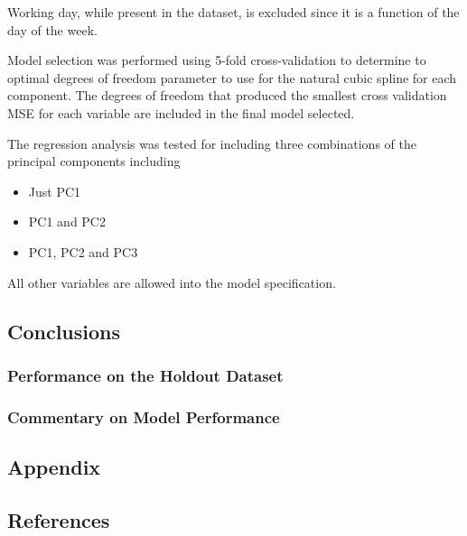 \documentclass[
]{article}
\begin{document}
Working day, while present in the dataset, is excluded since it is a
function of the day of the week.

Model selection was performed using 5-fold cross-validation to determine
to optimal degrees of freedom parameter to use for the natural cubic
spline for each component. The degrees of freedom that produced the
smallest cross validation MSE for each variable are included in the
final model selected.

The regression analysis was tested for including three combinations of
the principal components including

\begin{itemize}
\item
  Just PC1
\item
  PC1 and PC2
\item
  PC1, PC2 and PC3
\end{itemize}

All other variables are allowed into the model specification.

\hypertarget{conclusions}{%
\subsection{Conclusions}\label{conclusions}}

\hypertarget{performance-on-the-holdout-dataset}{%
\subsubsection{Performance on the Holdout
Dataset}\label{performance-on-the-holdout-dataset}}

\hypertarget{commentary-on-model-performance}{%
\subsubsection{Commentary on Model
Performance}\label{commentary-on-model-performance}}

\hypertarget{appendix}{%
\subsection{Appendix}\label{appendix}}

\hypertarget{references}{%
\subsection{References}\label{references}}
\end{document}
